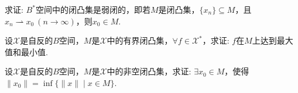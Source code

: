 \documentclass[../../main.tex]{subfiles}%
\begin{document}
\begin{example}
求证: $B^*$空间中的闭凸集是弱闭的，即若$M$是闭凸集，$\{x_n\}\subseteq M$，且$x_n\rightharpoonup x_0\ (n\to\infty)$，则$x_0\in M$.
\end{example}

\begin{example}
设$\mathscr{X}$是自反的$B$空间，$M$是$\mathscr{X}$中的有界闭凸集，$\forall f\in\mathscr{X}^*$，求证: $f$在$M$上达到最大值和最小值.
\end{example}

\begin{example}
设$\mathscr{X}$是自反的$B$空间，$M$是$\mathscr{X}$中的非空闭凸集，求证: $\exists x_0\in M$，使得$\|x_0\|=\inf\limits\{\|x\|\mid x\in M\}$.
\end{example}
\end{document}
